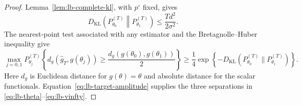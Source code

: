 \begin{proof}
Lemma~\ref{lem:lb-complete-kl}, with \(p^\circ\) fixed, gives
\[
 D_{\mathrm{KL}}\!\left(
 P_{\theta_0}^{(T)}\middle\|P_{\theta_1}^{(T)}
 \right)
 \leq \frac{Td^2}{2\sigma^2}.
\]
The nearest-point test associated with any estimator and the
Bretagnolle--Huber inequality \cite{BretagnolleHuber1978} give
\[
 \max_{j=0,1}P_{\theta_j}^{(T)}
 \left\{d_g(\widehat g_T,g(\theta_j))
 \geq\frac{d_g(g(\theta_0),g(\theta_1))}{2}\right\}
 \geq
 \frac14
 \exp\!\left\{
 -D_{\mathrm{KL}}(P_{\theta_0}^{(T)}\|P_{\theta_1}^{(T)})
 \right\}.
\]
Here \(d_g\) is Euclidean distance for \(g(\theta)=\theta\) and absolute
distance for the scalar functionals.
Equation~\eqref{eq:lb-target-amplitude} supplies the three separations in
\eqref{eq:lb-theta}--\eqref{eq:lb-vinfty}.
\end{proof}

